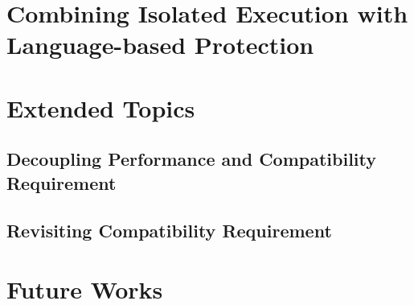 \section{Combining Isolated Execution with Language-based Protection}
\label{sec:intro:graphene}


\section{Extended Topics}

\subsection{Decoupling Performance and Compatibility Requirement}

\subsection{Revisiting Compatibility Requirement}

\section{Future Works}